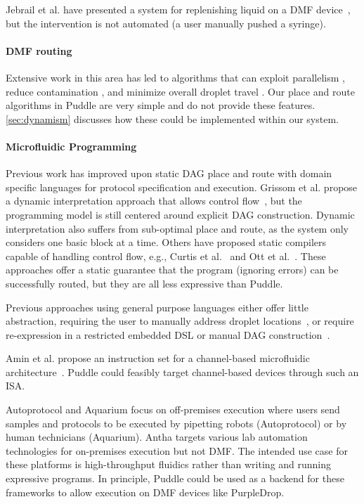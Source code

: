 \documentclass{jpaper}
\begin{document}
Jebrail et al. have presented a system for replenishing liquid on a DMF device~\cite{jebrail2015solvent}, but the intervention is not automated (a user manually pushed a syringe).

\paragraph{DMF routing}

Extensive work in this area has led to algorithms that can
exploit parallelism \cite{bohringer2006parallel, grissom2012scheduling},
reduce contamination \cite{yao2016contamination, zhao2012contamination, huang2010contamination},
and minimize overall droplet travel \cite{keszocze2015routing, roy2010routing}.
Our place and route algorithms in Puddle are very simple and do not provide these features.
\autoref{sec:dynamism} discusses how these could be implemented within our system.

\paragraph{Microfluidic Programming}
Previous work has improved upon static DAG place and route with domain specific languages for protocol specification and execution.
Grissom et al. propose a dynamic interpretation approach that allows control flow~\cite{grissom2014interpreting}, but the programming model is still centered around explicit DAG construction.
Dynamic interpretation also suffers from sub-optimal place and route, as the system only considers one basic block at a time.
Others have proposed static compilers capable of handling control flow, e.g., Curtis et al.~\cite{curtis2018compiler} and Ott et al.~\cite{ott2018bioscript}.
These approaches offer a static guarantee that the program (ignoring errors) can be successfully routed, but they are all less expressive than Puddle.

Previous approaches using general purpose languages either offer little abstraction, requiring the user to manually address droplet locations~\cite{opendrop, dropbot}, or require re-expression in a restricted embedded DSL or manual DAG construction~\cite{curtis2018compiler, biocoder}.

Amin et al. propose an instruction set for a channel-based microfluidic architecture~\cite{amin2007aquacore}.
Puddle could feasibly target channel-based devices through such an ISA.

Autoprotocol \cite{autoprotocol} and Aquarium \cite{aquarium} focus on off-premises execution where users send samples and protocols to be executed by pipetting robots (Autoprotocol) or by human technicians (Aquarium).
Antha \cite{antha} targets various lab automation technologies for on-premises execution but not DMF.
The intended use case for these platforms is high-throughput fluidics rather than writing and running expressive programs.
In principle, Puddle could be used as a backend for these frameworks to allow execution on DMF devices like PurpleDrop.
\end{document}
